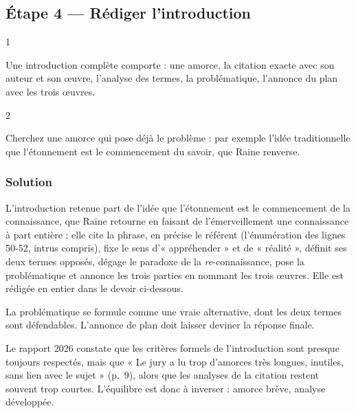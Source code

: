 \documentclass[11pt,a4paper]{article}
\begin{document}
\hypertarget{uxe9tape-4-ruxe9diger-lintroduction}{%
\subsection{Étape 4 --- Rédiger l'introduction}\label{uxe9tape-4-ruxe9diger-lintroduction}}

\begin{indication}{1}

Une introduction complète comporte : une amorce, la citation exacte avec son auteur et son œuvre, l'analyse des termes, la problématique, l'annonce du plan avec les trois œuvres.

\end{indication}

\begin{indication}{2}

Cherchez une amorce qui pose déjà le problème : par exemple l'idée traditionnelle que l'étonnement est le commencement du savoir, que Raine renverse.

\end{indication}

\hypertarget{solution-6}{%
\subsubsection{Solution}\label{solution-6}}

L'introduction retenue part de l'idée que l'étonnement est le commencement de la connaissance, que Raine retourne en faisant de l'émerveillement une connaissance à part entière ; elle cite la phrase, en précise le référent (l'énumération des lignes 50-52, intrus compris), fixe le sens d'« appréhender » et de « réalité », définit ses deux termes opposés, dégage le paradoxe de la \emph{re}-connaissance, pose la problématique et annonce les trois parties en nommant les trois œuvres. Elle est rédigée en entier dans le devoir ci-dessous.

\begin{methode}

La problématique se formule comme une vraie alternative, dont les deux termes sont défendables. L'annonce de plan doit laisser deviner la réponse finale.

\end{methode}

\begin{jury}

Le rapport 2026 constate que les critères formels de l'introduction sont presque toujours respectés, mais que « Le jury a lu trop d'amorces très longues, inutiles, sans lien avec le sujet » (p.~9), alors que les analyses de la citation restent souvent trop courtes. L'équilibre est donc à inverser : amorce brève, analyse développée.

\end{jury}
\end{document}

